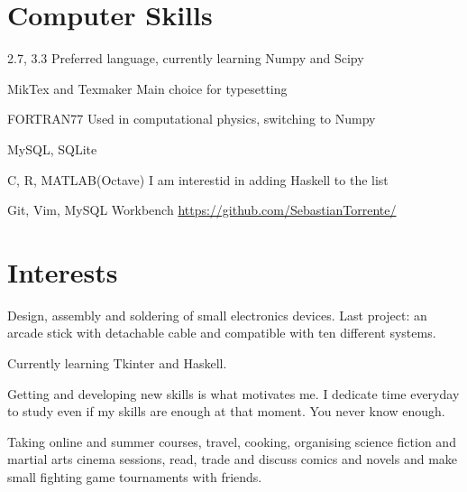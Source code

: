 \documentclass[11pt,a4paper,roman]{moderncv}
\begin{document}
\section{Computer Skills}

	{2.7, 3.3}
	{Preferred language, currently learning Numpy and Scipy}

\cvitemwithcomment{\LaTeX}
	{MikTex and Texmaker}
	{Main choice for typesetting}

	{FORTRAN77}
	{Used in computational physics, switching to Numpy}

	{MySQL, SQLite}
	{}

	{C, R, MATLAB(Octave)}
	{I am interestid in adding Haskell to the list}
	
	{Git, Vim, MySQL Workbench}
	{\href{https://github.com/SebastianTorrente/}
	{https://github.com/SebastianTorrente/}}




\section{Interests}

	{Design, assembly and soldering of small electronics devices. Last project: an arcade
	 stick with detachable cable and compatible with ten different systems.}

	{Currently learning Tkinter and Haskell.}

	{Getting and developing new skills is what motivates  me. I dedicate time 
	everyday to study even if my skills are enough at that moment. You never know enough.}


	{Taking online and summer courses, travel, cooking, organising science fiction and
	 martial arts cinema sessions, read, trade and discuss comics and novels and make
	  small fighting game tournaments with friends.}
\end{document}

